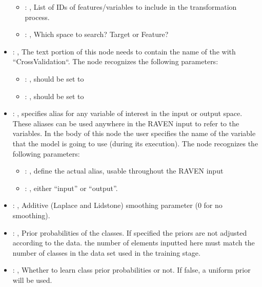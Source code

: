 \begin{itemize}
\begin{itemize}
        \item {}: , 
          List of IDs of features/variables to include in the transformation process.

        \item {}: , 
          Which space to search? Target or Feature?
      \end{itemize}

    \item {}: , 
      The text portion of this node needs to contain the name of the  with
               ``CrossValidation``.
      The  node recognizes the following parameters:
        \begin{itemize}
          \item {}: , 
            should be set to 
          \item {}: , 
            should be set to 
      \end{itemize}

    \item {}: , 
      specifies alias for         any variable of interest in the input or output space. These
      aliases can be used anywhere in the RAVEN input to         refer to the variables. In the body
      of this node the user specifies the name of the variable that the model is going to use
      (during its execution).
      The  node recognizes the following parameters:
        \begin{itemize}
          \item {}: , 
            define the actual alias, usable throughout the RAVEN input
          \item {}: , 
            either ``input'' or ``output''.
      \end{itemize}

    \item {}: , 
      Additive (Laplace and Lidstone) smoothing parameter (0 for no smoothing).

    \item {}: , 
      Prior probabilities of the classes. If specified the priors are
      not adjusted according to the data. \nb the number of elements inputted here must
      match the number of classes in the data set used in the training stage.

    \item {}: , 
      Whether to learn class prior probabilities or not. If false, a uniform
      prior will be used.
  \end{itemize}


